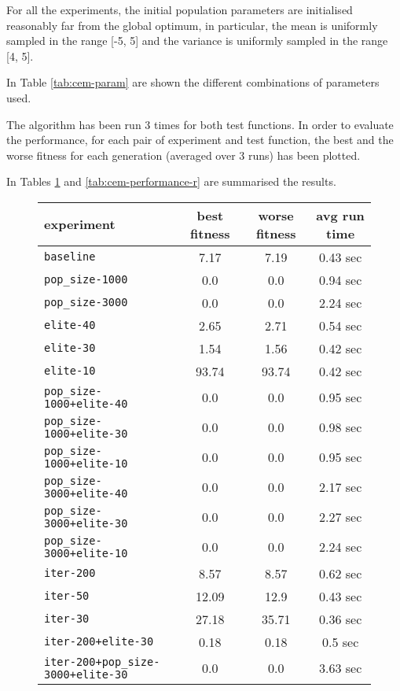 For all the experiments, the initial population parameters are initialised reasonably far from the global optimum, in particular, the mean is uniformly sampled in the range [-5, 5] and the variance is uniformly sampled in the range [4, 5].

In Table \ref{tab:cem-param} are shown the different combinations of parameters used.
\bigskip

The algorithm has been run 3 times for both test functions. 
In order to evaluate the performance, for each pair of experiment and test function, the best and the worse fitness for each generation (averaged over 3 runs) has been plotted. 
 
In Tables \ref{tab:cem-performance-s} and \ref{tab:cem-performance-r} are summarised the results. 
\bigskip

\begin{figure}[htb]
	\centering
	
	\begin{tabular}{lccc}
		\toprule
		\textbf{experiment} & \textbf{best fitness} & \textbf{worse fitness} & \textbf{avg run time} \\
		\midrule
		\texttt{baseline 						}		 &	  7.17 &	   7.19 &	  0.43 sec \\
		\texttt{pop\_size-1000 					}		&	   0.0 &	    0.0 &	  0.94 sec \\
		\texttt{pop\_size-3000 					}		&	   0.0 &	    0.0 &	  2.24 sec \\
		\texttt{elite-40 						}		 &	  2.65 &	   2.71 &	  0.54 sec \\
		\texttt{elite-30 						}		 &	  1.54 &	   1.56 &	  0.42 sec \\
		\texttt{elite-10 						}		 &	 93.74 &	  93.74 &	  0.42 sec \\
		\texttt{pop\_size-1000+elite-40 		}	 &	   0.0 &	    0.0 &	  0.95 sec \\
		\texttt{pop\_size-1000+elite-30 		}	 &	   0.0 &	    0.0 &	  0.98 sec \\
		\texttt{pop\_size-1000+elite-10 		}	 &	   0.0 &	    0.0 &	  0.95 sec \\
		\texttt{pop\_size-3000+elite-40 		}	 &	   0.0 &	    0.0 &	  2.17 sec \\
		\texttt{pop\_size-3000+elite-30 		}	 &	   0.0 &	    0.0 &	  2.27 sec \\
		\texttt{pop\_size-3000+elite-10 		}	 &	   0.0 &	    0.0 &	  2.24 sec \\
		\texttt{iter-200 						}		&	  8.57 &	   8.57 &	  0.62 sec \\
		\texttt{iter-50 						}	&	 12.09 &	   12.9 &	  0.43 sec \\
		\texttt{iter-30 						}	&	 27.18 &	  35.71 &	  0.36 sec \\
		\texttt{iter-200+elite-30 				}	&	  0.18 &	   0.18 &	   0.5 sec \\
		\texttt{iter-200+pop\_size-3000+elite-30} 	 &	   0.0 &	    0.0 &	  3.63 sec \\
		\bottomrule
	\end{tabular}
	\label{tab:cem-performance-s}
\end{figure}

